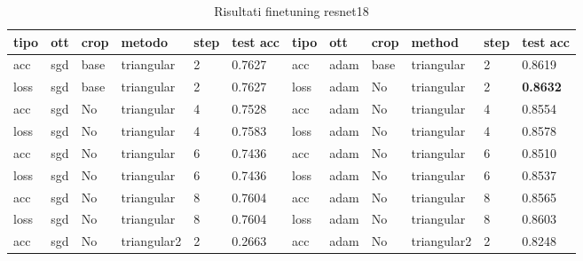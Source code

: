 \begin{table}[H]
\centering
\caption{Risultati finetuning resnet18}
\begin{adjustbox}{width=1\textwidth}
\begin{tabular}{|l|l|l|l|l|l||l|l|l|l|l|l|}
\hline
\textbf{tipo} & \textbf{ott} & \textbf{crop} & \textbf{metodo} & \textbf{step} & \textbf{test acc} & \textbf{tipo} & \textbf{ott} & \textbf{crop} & \textbf{method} & \textbf{step} & \textbf{test acc} \\ \hline
acc           & sgd          & base          & triangular      & 2             & 0.7627            & acc           & adam         & base          & triangular      & 2             & 0.8619   \\ \hline
loss          & sgd          & base          & triangular      & 2             & 0.7627            & loss          & adam         & No          & triangular      & 2             & \textbf{0.8632}            \\ \hline
acc           & sgd          & No          & triangular      & 4             & 0.7528            & acc           & adam         & No          & triangular      & 4             & 0.8554            \\ \hline
loss          & sgd          & No          & triangular      & 4             & 0.7583            & loss          & adam         & No          & triangular      & 4             & 0.8578            \\ \hline
acc           & sgd          & No          & triangular      & 6             & 0.7436            & acc           & adam         & No          & triangular      & 6             & 0.8510            \\ \hline
loss          & sgd          & No          & triangular      & 6             & 0.7436            & loss          & adam         & No          & triangular      & 6             & 0.8537            \\ \hline
acc           & sgd          & No          & triangular      & 8             & 0.7604            & acc           & adam         & No          & triangular      & 8             & 0.8565            \\ \hline
loss          & sgd          & No          & triangular      & 8             & 0.7604            & loss          & adam         & No          & triangular      & 8             & 0.8603            \\ \hline
acc           & sgd          & No          & triangular2     & 2             & 0.2663            & acc           & adam         & No          & triangular2     & 2             & 0.8248            \\ \hline

\end{tabular}
\end{adjustbox}
\end{table}
